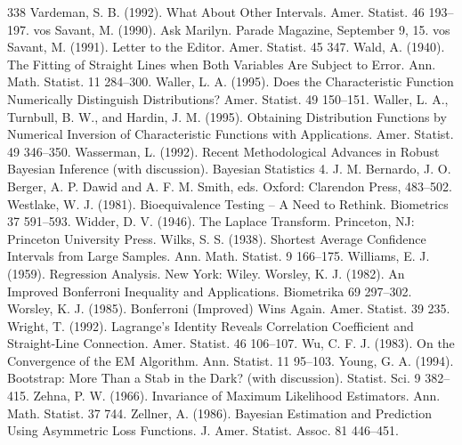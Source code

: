 \begin{thebibliography}{338}
\label{bib:source321} Vardeman, S. B. (1992). What About Other Intervals. Amer. Statist. 46 193–197.
\label{bib:source322} vos Savant, M. (1990). Ask Marilyn. Parade Magazine, September 9, 15.
\label{bib:source323} vos Savant, M. (1991). Letter to the Editor. Amer. Statist. 45 347.
\label{bib:source324} Wald, A. (1940). The Fitting of Straight Lines when Both Variables Are Subject to Error. Ann. Math. Statist. 11 284–300.
\label{bib:source325} Waller, L. A. (1995). Does the Characteristic Function Numerically Distinguish Distributions? Amer. Statist. 49 150–151.
\label{bib:source326} Waller, L. A., Turnbull, B. W., and Hardin, J. M. (1995). Obtaining Distribution Functions by Numerical Inversion of Characteristic Functions with Applications. Amer. Statist. 49 346–350.
\label{bib:source327} Wasserman, L. (1992). Recent Methodological Advances in Robust Bayesian Inference (with discussion). Bayesian Statistics 4. J. M. Bernardo, J. O. Berger, A. P. Dawid and A. F. M. Smith, eds. Oxford: Clarendon Press, 483–502.
\label{bib:source328} Westlake, W. J. (1981). Bioequivalence Testing – A Need to Rethink. Biometrics 37 591–593.
\label{bib:source329} Widder, D. V. (1946). The Laplace Transform. Princeton, NJ: Princeton University Press.
\label{bib:source330} Wilks, S. S. (1938). Shortest Average Confidence Intervals from Large Samples. Ann. Math. Statist. 9 166–175.
\label{bib:source331} Williams, E. J. (1959). Regression Analysis. New York: Wiley.
\label{bib:source332} Worsley, K. J. (1982). An Improved Bonferroni Inequality and Applications. Biometrika 69 297–302.
\label{bib:source333} Worsley, K. J. (1985). Bonferroni (Improved) Wins Again. Amer. Statist. 39 235.
\label{bib:source334} Wright, T. (1992). Lagrange’s Identity Reveals Correlation Coefficient and Straight-Line Connection. Amer. Statist. 46 106–107.
\label{bib:source335} Wu, C. F. J. (1983). On the Convergence of the EM Algorithm. Ann. Statist. 11 95–103.
\label{bib:source336} Young, G. A. (1994). Bootstrap: More Than a Stab in the Dark? (with discussion). Statist. Sci. 9 382–415.
\label{bib:source337} Zehna, P. W. (1966). Invariance of Maximum Likelihood Estimators. Ann. Math. Statist. 37 744.
\label{bib:source338} Zellner, A. (1986). Bayesian Estimation and Prediction Using Asymmetric Loss Functions. J. Amer. Statist. Assoc. 81 446–451.
\end{thebibliography}

